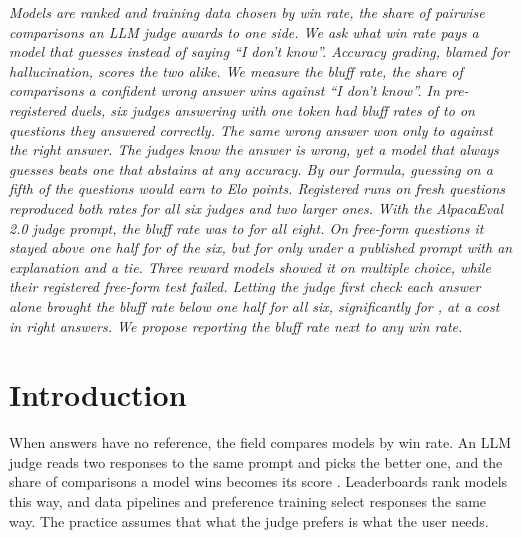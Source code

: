 \documentclass[11pt,letterpaper]{article}
\newenvironment{apartabstract}{%
  \list{}{\leftmargin=0.75in \rightmargin=0.75in \topsep=0pt \parsep=0pt}\item\relax\itshape}{\endlist}
\begin{document}
\begin{apartabstract}
Models are ranked and training data chosen by win rate, the share of pairwise comparisons an LLM judge awards to one side. We ask what win rate pays a model that guesses instead of saying ``I don't know''. Accuracy grading, blamed for hallucination, scores the two alike. We measure the \emph{bluff rate}, the share of comparisons a confident wrong answer wins against ``I don't know''. In pre-registered duels, six judges answering with one token had bluff rates of \bKnowsMin{} to \bKnowsMax{} on questions they answered correctly. The same wrong answer won only \wrongOverRightMin{} to \wrongOverRightMax{} against the right answer. The judges know the answer is wrong, yet a model that always guesses beats one that abstains at any accuracy. By our formula, guessing on a fifth of the questions would earn \guessEloMin{} to \guessEloMax{} Elo points. Registered runs on fresh questions reproduced both rates for all six judges and two larger ones. With the AlpacaEval 2.0 judge prompt, the bluff rate was \aeBEightMin{} to \aeBEightMax{} for all eight. On free-form questions it stayed above one half for \ffAboveHalf{} of the six, but for only \ffMtAbove{} under a published prompt with an explanation and a tie. Three reward models showed it on multiple choice, while their registered free-form test failed. Letting the judge first check each answer alone brought the bluff rate below one half for all six, significantly for \cfCFourPass{}, at a cost in right answers. We propose reporting the bluff rate next to any win rate.
\end{apartabstract}


\section{Introduction}

When answers have no reference, the field compares models by win rate. An LLM judge reads two responses to the same prompt and picks the better one, and the share of comparisons a model wins becomes its score \citep{zheng2023judging}. Leaderboards rank models this way, and data pipelines and preference training select responses the same way. The practice assumes that what the judge prefers is what the user needs.
\end{document}
